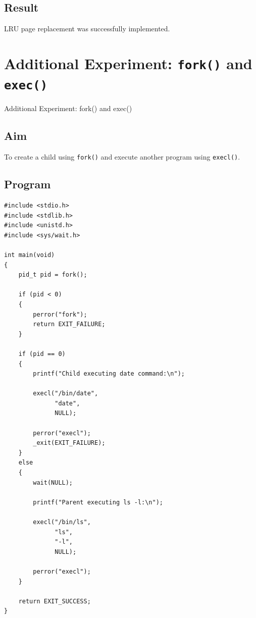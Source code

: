 \documentclass[12pt,a4paper]{report}
\begin{document}
\section*{Result}

LRU page replacement was successfully implemented.


\chapter*{Additional Experiment: \texttt{fork()} and \texttt{exec()}}
{Additional Experiment: fork() and exec()}

\section*{Aim}

To create a child using \texttt{fork()} and execute another program using
\texttt{execl()}.

\section*{Program}

\begin{lstlisting}
#include <stdio.h>
#include <stdlib.h>
#include <unistd.h>
#include <sys/wait.h>

int main(void)
{
    pid_t pid = fork();

    if (pid < 0)
    {
        perror("fork");
        return EXIT_FAILURE;
    }

    if (pid == 0)
    {
        printf("Child executing date command:\n");

        execl("/bin/date",
              "date",
              NULL);

        perror("execl");
        _exit(EXIT_FAILURE);
    }
    else
    {
        wait(NULL);

        printf("Parent executing ls -l:\n");

        execl("/bin/ls",
              "ls",
              "-l",
              NULL);

        perror("execl");
    }

    return EXIT_SUCCESS;
}
\end{lstlisting}

\end{document}
